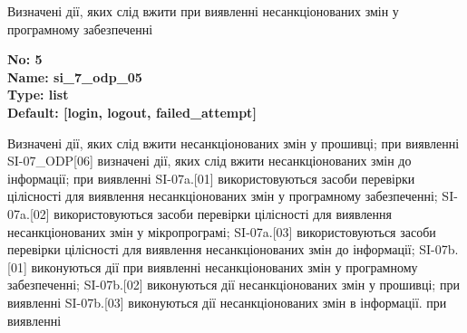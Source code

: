 \documentclass{article}
\begin{document}
{\footnotesize Визначені дії, яких слід вжити при виявленні несанкціонованих змін у програмному забезпеченні}


{\footnotesize\bfseries
No: 5\\
Name: si\_\allowbreak{}7\_\allowbreak{}odp\_\allowbreak{}05\\
Type: list\\
Default: [\textquotedbl{}login\textquotedbl{}, \textquotedbl{}logout\textquotedbl{}, \textquotedbl{}failed\_\allowbreak{}attempt\textquotedbl{}]
}

{\footnotesize Визначені дії, яких слід вжити несанкціонованих змін у прошивці; при виявленні SI-07\_\allowbreak{}ODP[06] визначені дії, яких слід вжити несанкціонованих змін до інформації; при виявленні SI-07a.[01] використовуються засоби перевірки цілісності для виявлення несанкціонованих змін у програмному забезпеченні; SI-07a.[02] використовуються засоби перевірки цілісності для виявлення несанкціонованих змін у мікропрограмі; SI-07a.[03] використовуються засоби перевірки цілісності для виявлення несанкціонованих змін до інформації; SI-07b.[01] виконуються дії при виявленні несанкціонованих змін у програмному забезпеченні; SI-07b.[02] виконуються дії несанкціонованих змін у прошивці; при виявленні SI-07b.[03] виконуються дії несанкціонованих змін в інформації. при виявленні}
\end{document}
